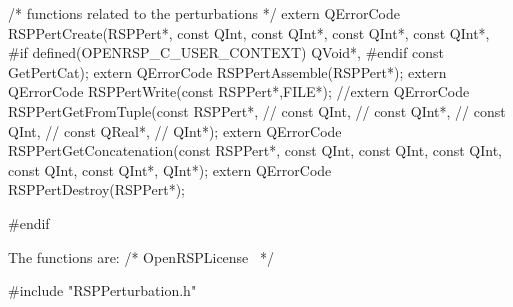 /* functions related to the perturbations */
extern QErrorCode RSPPertCreate(RSPPert*,
                                const QInt,
                                const QInt*,
                                const QInt*,
                                const QInt*,
#if defined(OPENRSP_C_USER_CONTEXT)
                                QVoid*,
#endif
                                const GetPertCat);
extern QErrorCode RSPPertAssemble(RSPPert*);
extern QErrorCode RSPPertWrite(const RSPPert*,FILE*);
//extern QErrorCode RSPPertGetFromTuple(const RSPPert*,
//                                      const QInt,
//                                      const QInt*,
//                                      const QInt,
//                                      const QReal*,
//                                      QInt*);
extern QErrorCode RSPPertGetConcatenation(const RSPPert*,
                                          const QInt,
                                          const QInt,
                                          const QInt,
                                          const QInt,
                                          const QInt*,
                                          QInt*);
extern QErrorCode RSPPertDestroy(RSPPert*);

#endif
\nwendcode{}\nwdocspar

The functions are:
\nwenddocs{}\endmoddef
/*
  \LA{}OpenRSPLicense~{\nwtagstyle{}}\RA{}
*/

#include "RSPPerturbation.h"

